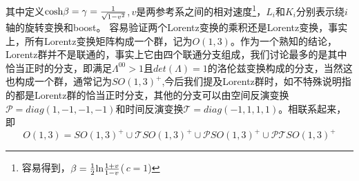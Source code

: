 其中定义${\rm cosh}\beta=\gamma=\frac{1}{\sqrt{1-v^{2}}}$,$\,v$是两参考系之间的相对速度\footnote{容易得到，$\beta=\frac{1}{2}{\rm ln}\frac{1+v}{1-v}$($\,c=1$)}，$L_{i}$和$K_{i}$分别表示绕$i$轴的旋转变换和boost。
容易验证两个Lorentz变换的乘积还是Lorentz变换，事实上，所有Lorentz变换矩阵构成一个群，记为$O(1,3)$。作为一个熟知的结论，Lorentz群并不是联通的，事实上它由四个联通分支组成，我们讨论最多的是其中恰当正时的分支，即满足$\Lambda^{00}>1$且$det(\Lambda)=1$的洛伦兹变换构成的分支，当然这也构成一个群，通常记为$SO(1,3)^{+}$,今后我们提及Lorentz群时，如不特殊说明指的都是Lorentz群的恰当正时分支，其他的分支可以由空间反演变换$\mathcal{P}=diag(1,-1,-1,-1)$和时间反演变换$\mathcal{T}=diag(-1,1,1,1)$。相联系起来，即
\begin{equation}
    O(1,3)=SO(1,3)^{+}\cup \mathcal{T}SO(1,3)^{+}\cup \mathcal{P}SO(1,3)^{+}\cup \mathcal{PT}SO(1,3)^{+}
\end{equation}

